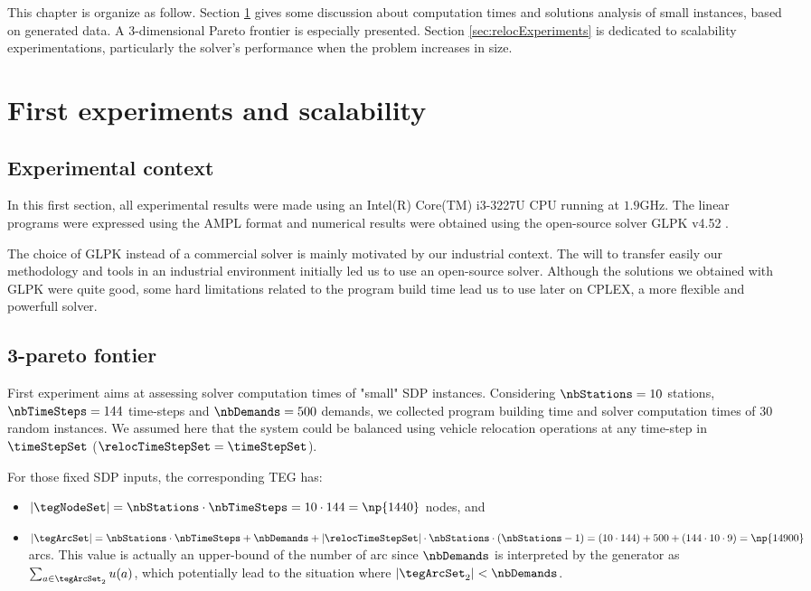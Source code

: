 \begin{bibunit}[ieeetr]
\bigskip
This chapter is organize as follow.
Section \ref{sec:firstExperiments} gives some discussion about computation times and solutions analysis of small instances, based on generated data.
A 3-dimensional Pareto frontier is especially presented.
Section \ref{sec:relocExperiments} is dedicated to scalability experimentations, particularly the solver's performance when the problem increases in size.

\section{First experiments and scalability} \label{sec:firstExperiments}
\subsection{Experimental context}
In this first section, all experimental results were made using an Intel(R) Core(TM) i3-3227U CPU running at $1.9$GHz. The linear programs were expressed using the AMPL format \cite{ampl_webPage} and numerical results were obtained using the open-source solver GLPK v4.52 \cite{glpk_webPage}.

\bigskip
The choice of GLPK instead of a commercial solver is mainly motivated by our industrial context.
The will to transfer easily our methodology and tools in an industrial environment initially led us to use an open-source solver.
Although the solutions we obtained with GLPK were quite good, some hard limitations related to the program build time lead us to use later on CPLEX, a more flexible and powerfull solver.

\subsection{3-pareto fontier}
First experiment aims at assessing solver computation times of "small" SDP instances.
Considering $\nbStations = 10$ stations, $\nbTimeSteps = 144$ time-steps and $\nbDemands = 500$ demands, we collected program building time and solver computation times of $30$ random instances.
We assumed here that the system could be balanced using vehicle relocation operations at any time-step in $\timeStepSet$ (\ie $\relocTimeStepSet = \timeStepSet$).

\bigskip
For those fixed SDP inputs, the corresponding TEG has:
\begin{itemize}
\item $|\tegNodeSet| = \nbStations \cdot \nbTimeSteps = 10 \cdot 144 = \np{1440}$ nodes, and
\item $|\tegArcSet| = \nbStations \cdot \nbTimeSteps + \nbDemands + |\relocTimeStepSet| \cdot \nbStations \cdot (\nbStations - 1) = (10 \cdot 144) + 500 + (144 \cdot 10 \cdot 9) = \np{14900}$ arcs. This value is actually an upper-bound of the number of arc since $\nbDemands$ is interpreted by the generator as $\sum_{a \in \tegArcSet_2} u(a)$, which potentially lead to the situation where $|\tegArcSet_2| < \nbDemands$.
\end{itemize}


\end{bibunit}
